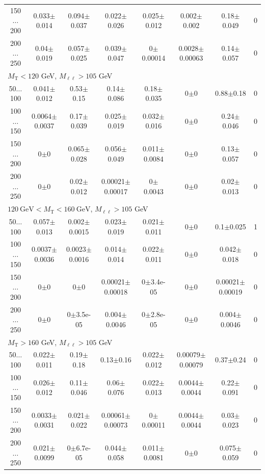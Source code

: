 \begin{landscape}
\begin{table}
\begin{center}
\begin{tabular}{| c | c c c c c c c | }
150$\dots$200&0.033$\pm$0.014&0.094$\pm$0.037&0.022$\pm$0.026&0.025$\pm$0.012&0.002$\pm$0.002&0.18$\pm$0.049&0\\
200$\dots$250&0.04$\pm$0.019&0.057$\pm$0.025&0.039$\pm$0.047&0$\pm$0.00014&0.0028$\pm$0.00063&0.14$\pm$0.057&0\\
\hline\hline
\multicolumn{7}{l}{$M_{\text{T}} < 120$ GeV, $M_{\ell\ell} > 105$ GeV}\\\hline\hline
50$\dots$100&0.041$\pm$0.012&0.53$\pm$0.15&0.14$\pm$0.086&0.18$\pm$0.035&0$\pm$0&0.88$\pm$0.18&0\\
100$\dots$150&0.0064$\pm$0.0037&0.17$\pm$0.039&0.025$\pm$0.019&0.032$\pm$0.016&0$\pm$0&0.24$\pm$0.046&0\\
150$\dots$200&0$\pm$0&0.065$\pm$0.028&0.056$\pm$0.049&0.011$\pm$0.0084&0$\pm$0&0.13$\pm$0.057&0\\
200$\dots$250&0$\pm$0&0.02$\pm$0.012&0.00021$\pm$0.00017&0$\pm$0.0043&0$\pm$0&0.02$\pm$0.013&0\\
\hline\hline
\multicolumn{7}{l}{$120~\mathrm{GeV} < M_{\text{T}} < 160~\mathrm{GeV}$, $M_{\ell\ell} > 105$ GeV}\\\hline\hline
50$\dots$100&0.057$\pm$0.013&0.002$\pm$0.0015&0.023$\pm$0.019&0.021$\pm$0.011&0$\pm$0&0.1$\pm$0.025&1\\
100$\dots$150&0.0037$\pm$0.0036&0.0023$\pm$0.0016&0.014$\pm$0.014&0.022$\pm$0.011&0$\pm$0&0.042$\pm$0.018&0\\
150$\dots$200&0$\pm$0&0$\pm$0&0.00021$\pm$0.00018&0$\pm$3.4e-05&0$\pm$0&0.00021$\pm$0.00019&0\\
200$\dots$250&0$\pm$0&0$\pm$3.5e-05&0.004$\pm$0.0046&0$\pm$2.8e-05&0$\pm$0&0.004$\pm$0.0046&0\\
\hline\hline
\multicolumn{7}{l}{$M_{\text{T}} > 160$ GeV, $M_{\ell\ell} > 105$ GeV}\\\hline\hline
50$\dots$100&0.022$\pm$0.011&0.19$\pm$0.18&0.13$\pm$0.16&0.022$\pm$0.012&0.00079$\pm$0.00079&0.37$\pm$0.24&0\\
100$\dots$150&0.026$\pm$0.012&0.11$\pm$0.046&0.06$\pm$0.076&0.022$\pm$0.013&0.0044$\pm$0.0044&0.22$\pm$0.091&0\\
150$\dots$200&0.0033$\pm$0.0031&0.021$\pm$0.022&0.00061$\pm$0.00073&0$\pm$0.00011&0.0044$\pm$0.0044&0.03$\pm$0.023&0\\
200$\dots$250&0.021$\pm$0.0099&0$\pm$6.7e-05&0.044$\pm$0.058&0.011$\pm$0.0081&0$\pm$0&0.075$\pm$0.059&0\\
\hline\hline
\end{tabular}
\end{center}

\end{table}
\end{landscape}
